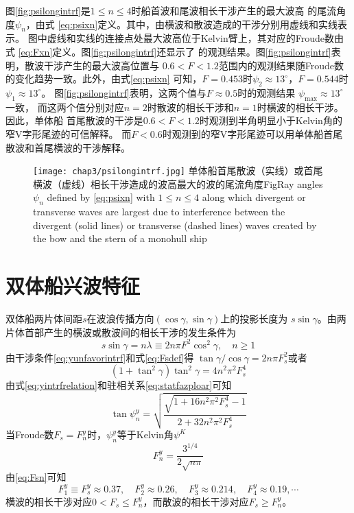 图\ref{fig:psilongintrf}是$1\le n\le4$时船首波和尾波相长干涉产生的最大波高
的尾流角度$\psi_n$，由式
\eqref{eq:psixn}定义。其中，由横波和散波造成的干涉分别用虚线和实线表示。
图中虚线和实线的连接点处最大波高位于Kelvin臂上，其对应的Froude数由式
\eqref{eq:Fxn}定义。图\ref{fig:psilongintrf}还显示了\parencite{Rabaud2013Ship}
的观测结果。图\ref{fig:psilongintrf}表明，散波干涉产生的最大波高位置与
$0.6<F<1.2$范围内的观测结果随Froude数的变化趋势一致。此外，由式\eqref{eq:psixn}
可知，$F=0.453$时$\psi_2\approx 13^\circ$，$F=0.544$时$\psi_1\approx13^\circ$。
图\ref{fig:psilongintrf}表明，这两个值与$F\approx 0.5$时的观测结果
$\psi_{\max}\approx 13^\circ$一致，
而这两个值分别对应$n=2$时散波的相长干涉和$n=1$时横波的相长干涉。因此，单体船
首尾散波的干涉是$0.6<F<1.2$时观测到半角明显小于Kelvin角的窄V字形尾迹的可信解释。
而$F<0.6$时观测到的窄V字形尾迹可以用单体船首尾散波和首尾横波的干涉解释。
%
\begin{figure}[htp]
  \centering
  \captionstyle{\centering}
  \texttt{[image: chap3/psilongintrf.jpg]}
  {单体船首尾散波（实线）或首尾横波（虚线）相长干涉造成的波高最大的波的尾流角度}{Fig}{Ray angles $\psi_n$ defined by \eqref{eq:psixn} with $1\le n\le 4$ along which divergent or transverse waves are
largest due to interference between the divergent (solid lines) or transverse
(dashed lines) waves created by the bow and the stern of a monohull ship}
\end{figure}

\section{双体船兴波特征}
\label{sec:catwavchar}

双体船两片体间距$s$在波浪传播方向$(\cos\gamma,\sin\gamma)$上的投影长度为
$s\sin\gamma$。由两片体首部产生的横波或散波间的相长干涉的发生条件为
\begin{equation}
  s\sin\gamma=n\lambda\equiv 2n\pi F^2\cos^2\gamma,\quad n\ge 1
  \label{eq:yunfavorintrf}
\end{equation}
由干涉条件\eqref{eq:yunfavorintrf}和式\eqref{eq:Fsdef}得
$\tan\gamma/\cos\gamma=2n\pi F_s^2$或者
\begin{equation}
  (1+\tan^2\gamma)\tan^2\gamma=4n^2\pi^2F_s^4
  \label{eq:yintrfrelation}
\end{equation}
由式\eqref{eq:yintrfrelation}和驻相关系\eqref{eq:statfazploar}可知
\begin{equation}
  \tan\psi_n^y=\sqrt{\frac{\sqrt{1+16n^2\pi^2F_s^4}-1}{2+32n^2\pi^2F_s^4}}
  \label{eq:psiyn}
\end{equation}
当Froude数$F_s=F_n^y$时，$\psi_n^y$等于Kelvin角$\psi^K$
\begin{equation}
  F_n^y=\frac{3^{1/4}}{2\sqrt{n\pi}}
  \label{eq:Fsn}
\end{equation}
由\eqref{eq:Fsn}可知
\begin{equation}
  F_1^y\equiv F_s^y\approx 0.37,\quad F_2^y\approx0.26,\quad F_3^y\approx 0.214,
  \quad F_4^y\approx 0.19, \cdots
\end{equation}
横波的相长干涉对应$0<F_s\le F_n^y$，而散波的相长干涉对应$F_s\ge F_n^y$。

